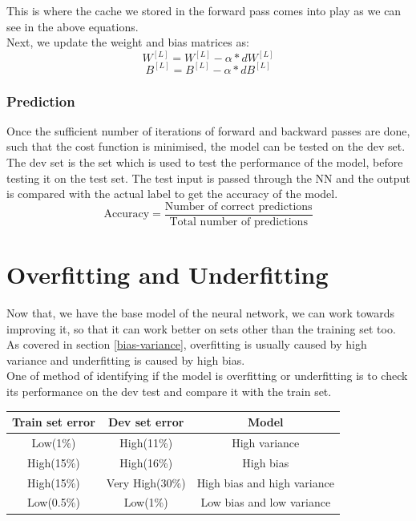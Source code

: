 \documentclass[12pt]{article}
\begin{document}

This is where the cache we stored in the forward pass comes into play as we can see in the above equations.\\
Next, we update the weight and bias matrices as:
\begin{equation}
    W^{[L]} = W^{[L]} - \alpha * dW^{[L]}
\end{equation}
\begin{equation}
    B^{[L]} = B^{[L]} - \alpha * dB^{[L]}
\end{equation}

\subsubsection{Prediction}
Once the sufficient number of iterations of forward and backward passes are done, such that the cost function is minimised, the model can be tested on the dev set. The dev set is the set which is used to test the performance of the model, before testing it on the test set. The test input is passed through the NN and the output is compared with the actual label to get the accuracy of the model.\\
\begin{equation}
    \text{Accuracy} = \frac{\text{Number of correct predictions}}{\text{Total number of predictions}}   
\end{equation}
\newpage
\section{Overfitting and Underfitting}
Now that, we have the base model of the neural network, we can work towards improving it, so that it can work better on sets other than the training set too.\\

As covered in section \ref{bias-variance}, overfitting is usually caused by high variance and underfitting is caused by high bias.\\
One of method of identifying if the model is overfitting or underfitting is to check its performance on the dev test and compare it with the train set.
\begin{center}
    \begin{table}[h]
        \centering
        \begin{tabular}{|c|c|c|}
            \hline
            Train set error & Dev set error & Model\\
            \hline
            Low(1\%) & High(11\%) & High variance\\
            High(15\%) & High(16\%) & High bias\\
            High(15\%) & Very High(30\%) & High bias and high variance\\
            Low(0.5\%) & Low(1\%) & Low bias and low variance\\
            \hline
        \end{tabular}
        \label{tab:my_label}
    \end{table}
\end{center}
\end{document}
